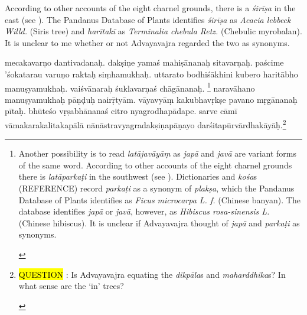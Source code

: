 \documentclass[naipra.tex]{subfiles}
\begin{document}
\begin{sanskrit}
{\begin{english}
	According to other accounts of the eight charnel grounds, there is a \emph{śirīṣa} in the east (see \cite[vol.\ 2 739–740]{gerloff2020}).
	The Pandanus Database of Plants identifies \emph{śirīṣa} as \emph{Acacia lebbeck Willd.} (Siris tree) and \emph{harītakī} as \emph{Terminalia chebula Retz.} (Chebulic myrobalan).
	It is unclear to me whether or not Advayavajra regarded the two as synonyms.
\end{english}} mecakavarṇo dantivadanaḥ.
dakṣiṇe yamaś  mahiṣānanaḥ sitavarṇaḥ.
paścime 'śokatarau varuṇo raktaḥ siṃhamukhaḥ.
uttarato bodhiśākhini kubero haritābho manuṣyamukhaḥ.  
  vaiśvānaraḥ śuklavarṇaś chāgānanaḥ.
\footnote{\begin{english}
	Another possibility is to read \emph{latājavāyāṃ} as \emph{japā} and \emph{javā} are variant forms of the same word.
	According to other accounts of the eight charnel grounds there is \emph{latāparkaṭi} in the southwest (see \cite[vol.\ 2 739–740]{gerloff2020}).
	Dictionaries and \emph{kośa}s (REFERENCE) record \emph{parkaṭi} as a synonym of \emph{plakṣa}, which the Pandanus Database of Plants identifies as \emph{Ficus microcarpa L. f.} (Chinese banyan).
	The database identifies \emph{japā} or \emph{javā}, however, as \emph{Hibiscus rosa-sinensis L.} (Chinese hibiscus).
	It is unclear if Advayavajra thought of \emph{japā} and \emph{parkaṭi} as synonyms.
\end{english}} naravāhano manuṣyamukhaḥ pāṇḍuḥ nairṝtyām.
vāyavyāṃ kakubhavṛkṣe pavano mṛgānanaḥ pītaḥ.
 bhūteśo vṛṣabhānanaś citro nyagrodhapādape.
sarve cāmī vāmakarakalitakapālā nānāstravyagradakṣiṇapāṇayo darśitapūrvārdhakāyāḥ.\footnote{\begin{english}
	\hl{QUESTION} : Is Advayavajra equating the \emph{dikpāla}s and \emph{maharddhika}s? In what sense are the `in' trees?
\end{english}}
\pend




\end{sanskrit}
\end{document}
